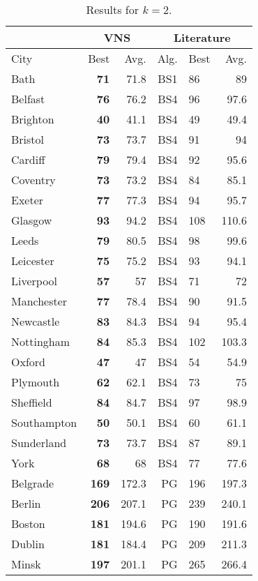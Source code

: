 \documentclass[dvipsnames,format=sigconf,anonymous=true,review=true]{acmart}
\begin{document}
\begin{table}
	\caption{Results for $k=2$.}
	\label{tab:k2}  
	\begin{tabular}{l|rr|rlr}
		\hline
		\multicolumn{1}{c}{ } & \multicolumn{2}{|c}{VNS} & \multicolumn{3}{|c}{Literature} \\
		\hline
		City & Best & Avg. & Alg. & Best & Avg. \\ \hline
		Bath&\bf{71}&71.8&BS1&86&89\\
		Belfast&\bf{76}&76.2&BS4&96&97.6\\
		Brighton&\bf{40}&41.1&BS4&49&49.4\\
		Bristol&\bf{73}&73.7&BS4&91&94\\
		Cardiff&\bf{79}&79.4&BS4&92&95.6\\
		Coventry&\bf{73}&73.2&BS4&84&85.1\\
		Exeter&\bf{77}&77.3&BS4&94&95.7\\
		Glasgow&\bf{93}&94.2&BS4&108&110.6\\
		Leeds&\bf{79}&80.5&BS4&98&99.6\\
		Leicester&\bf{75}&75.2&BS4&93&94.1\\
		Liverpool&\bf{57}&57&BS4&71&72\\
		Manchester&\bf{77}&78.4&BS4&90&91.5\\
		Newcastle&\bf{83}&84.3&BS4&94&95.4\\
		Nottingham&\bf{84}&85.3&BS4&102&103.3\\
		Oxford&\bf{47}&47&BS4&54&54.9\\
		Plymouth&\bf{62}&62.1&BS4&73&75\\
		Sheffield&\bf{84}&84.7&BS4&97&98.9\\
		Southampton&\bf{50}&50.1&BS4&60&61.1\\
		Sunderland&\bf{73}&73.7&BS4&87&89.1\\
		York&\bf{68}&68&BS4&77&77.6\\  \hline  \hline
		Belgrade&\bf{169}&172.3&PG&196&197.3\\
		Berlin&\bf{206}&207.1&PG&239&240.1\\
		Boston&\bf{181}&194.6&PG&190&191.6\\
		Dublin&\bf{181}&184.4&PG&209&211.3\\
		Minsk&\bf{197}&201.1&PG&265&266.4\\
		\hline
	\end{tabular}
\end{table}
\end{document}
